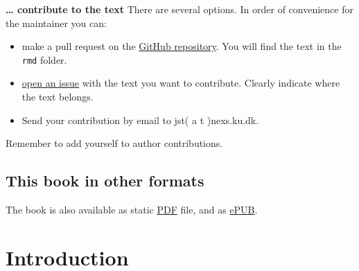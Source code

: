 \documentclass[]{article}
\providecommand{\tightlist}{%
  \setlength{\itemsep}{0pt}\setlength{\parskip}{0pt}}
\begin{document}
\textbf{\ldots{} contribute to the text}
There are several options. In order of convenience for the maintainer you can:

\begin{itemize}
\tightlist
\item
  make a pull request on the \href{https://github.com/rformassspectrometry/metaRbolomics-book}{GitHub repository}. You will find the text in the \texttt{rmd} folder.
\item
  \href{https://github.com/rformassspectrometry/metaRbolomics-book/issues}{open an issue} with the text you want to contribute. Clearly indicate where the text belongs.
\item
  Send your contribution by email to jst( a t )nexs.ku.dk.
\end{itemize}

Remember to add yourself to author contributions.

\hypertarget{this-book-in-other-formats}{%
\subsection*{This book in other formats}\label{this-book-in-other-formats}}

The book is also available as static \href{https://rformassspectrometry.github.io/metaRbolomics-book/The_MetaRbolomics_book.pdf}{PDF}
file, and as \href{https://rformassspectrometry.github.io/metaRbolomics-book/The_MetaRbolomics_book.epub}{ePUB}.

\newpage

\hypertarget{introduction}{%
\section{Introduction}\label{introduction}}
\end{document}
